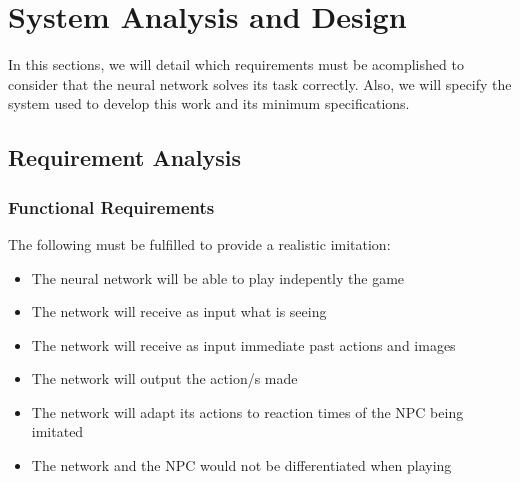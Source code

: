 %
%
%

\chapter{System Analysis and Design}

\minitoc{}

\bigskip{}

In this sections, we will detail which requirements must be acomplished to consider that the neural network solves its task correctly. Also, we will specify the system used to develop this work and its minimum specifications.

\section{Requirement Analysis}

\subsection{Functional Requirements}
\label{sec:funcReq}

The following must be fulfilled to provide a realistic imitation:

\begin{itemize}
 \item The neural network will be able to play indepently the game
 \item The network will receive as input what is seeing
 \item The network will receive as input immediate past actions and images
 \item The network will output the action/s made
 \item The network will adapt its actions to reaction times of the NPC being imitated
 \item The network and the NPC would not be differentiated when playing
\end{itemize}

